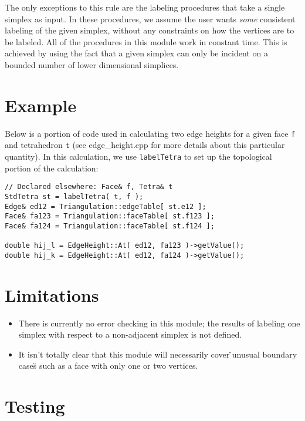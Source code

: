 The only exceptions to this rule are the labeling procedures that take a single simplex as input. In these procedures, we assume the user wants \textit{some} consistent labeling of the given simplex, without any constraints on how the vertices are to be labeled.\newline
All of the procedures in this module work in constant time. This is achieved by using the fact that a given simplex can only be incident on a bounded number of lower dimensional simplices.

\section{Example}

Below is a portion of code used in calculating two edge heights for a given face \texttt{f} and tetrahedron \texttt{t} (see edge\_height.cpp for more details about this particular quantity). In this calculation, we use \texttt{labelTetra} to set up the topological portion of the calculation:\newline
{\small{\begin{verbatim} 
// Declared elsewhere: Face& f, Tetra& t
StdTetra st = labelTetra( t, f );
Edge& ed12 = Triangulation::edgeTable[ st.e12 ];
Face& fa123 = Triangulation::faceTable[ st.f123 ];
Face& fa124 = Triangulation::faceTable[ st.f124 ];

double hij_l = EdgeHeight::At( ed12, fa123 )->getValue();
double hij_k = EdgeHeight::At( ed12, fa124 )->getValue();
\end{verbatim}
}}

\section{Limitations}

\begin{itemize}\item  There is currently no error checking in this module; the results of labeling one simplex with respect to a non-adjacent simplex is not defined.
\item  It isn't totally clear that this module will necessarily cover \"{}unusual boundary cases\"{} such as a face with only one or two vertices. 
\end{itemize}

\section{Testing}

